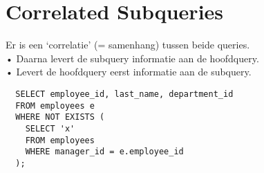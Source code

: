 \section{Correlated Subqueries}
Er is een ‘correlatie’ (= samenhang) tussen beide queries.
\\
• Daarna levert de subquery informatie aan de hoofdquery.\\
• Levert de hoofdquery eerst informatie aan de subquery.\\

\begin{tiny}
\begin{lstlisting}
  SELECT employee_id, last_name, department_id
  FROM employees e
  WHERE NOT EXISTS (
    SELECT 'x'
    FROM employees
    WHERE manager_id = e.employee_id
  );
\end{lstlisting}
\end{tiny}